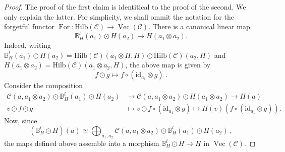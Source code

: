 \documentclass[10pt,a4paper]{amsart}
\DeclareMathOperator{\For}{For}
\newcommand{\Hilb}{\mathrm{Hilb}}
\DeclareMathOperator{\Vect}{Vec}
\newcommand{\bB}{\mathbb B}
\newcommand{\cC}{\mathcal C}
\newcommand{\id}{\mathrm{id}}
\begin{document}
\begin{proof}
The proof of the first claim is identitical to the proof of the second. We only explain the latter. For simplicity, we shall ommit the notation for the forgetful functor $\For: \Hilb(\cC) \to \Vect(\cC)$. There is a canonical linear map
\[ \bB^l_H(a_1) \odot H(a_2) \to H(a_1 \otimes a_2) . \]
Indeed, writing $\bB^l_H(a_1) \odot H(a_2) = \Hilb(\cC)(a_1 \otimes H,H) \odot \Hilb(\cC)(a_2,H)$ and $H(a_1 \otimes a_2) = \Hilb(\cC)(a_1 \otimes a_2, H)$, the above map is given by
    \[ f \odot g \mapsto f \circ (\id_{a_1} \otimes g) \ . \]
    Consider the composition
    \begin{align*}
    \cC(a, a_1 \otimes a_2) \odot \bB^l_H(a_1) \odot H(a_2) &\to \cC(a,a_1 \otimes a_2) \odot H(a_1 \otimes a_2)\to H(a) \\
    v \odot f \odot g &\mapsto v \odot f \circ (\id_{a_1} \otimes g)  \mapsto H(v) \left( f \circ (\id_{a_1} \otimes g) \right). 
    \end{align*}
    Now, since
    \[ (\bB^l_H \odot H) (a) \simeq \bigoplus_{a_1,a_2} \cC(a,a_1 \otimes a_2) \odot \bB^l_H(a_1) \odot H(a_2) \ , \]
    the maps defined above assemble into a morphism $\bB^l_H \odot H \to H$ in $\Vect(\cC)$.


\end{proof}
\end{document}
